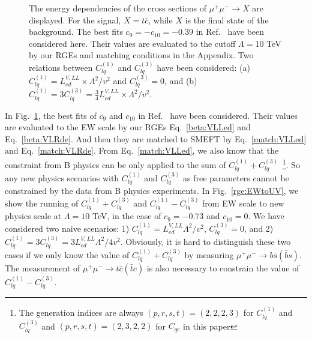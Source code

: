 \documentclass[a4paper,11pt]{article}
\begin{document}
\begin{figure}
  \centering
  \caption{The energy dependencies of the cross sections of $\mu^+\mu^-\to X$ are displayed. For the signal, $X=t\bar{c}$, while $X$ is the final state of the background. The best fits $c_{9}=-c_{10}=-0.39$ in Ref.~\cite{Altmannshofer:2021qrr} have been considered here. Their values are evaluated to the cutoff $\Lambda=10$ TeV by our RGEs and matching conditions in the Appendix. Two relations between $C^{(1)}_{lq}$ and $C^{(3)}_{lq}$ have been considered: (a) $C^{(1)}_{lq}=L^{V,LL}_{ed}\times \Lambda^2/v^2$ and $C^{(3)}_{lq}=0$, and (b) $C^{(1)}_{lq}=3C^{(3)}_{lq}=\frac{3}{4}L^{V,LL}_{ed}\times \Lambda^2/v^2$.\label{ecm}}
\end{figure}

In Fig.~\ref{ecm}, the best fits of $c_{9}$ and $c_{10}$ in Ref.~\cite{Altmannshofer:2021qrr} have been considered. 
Their values are evaluated to the EW scale by our RGEs Eq.~\ref{beta:VLLed} and Eq.~\ref{beta:VLRde}. 
And then they are matched to SMEFT by Eq.~\ref{match:VLLed} and Eq.~\ref{match:VLRde}. 
From Eq.~\ref{match:VLLed}, we also know that the constraint from B physics can be only applied to the sum of $C^{(1)}_{lq}+C^{(3)}_{lq}$~\footnote{The generation indices are always $(p,r,s,t)=(2,2,2,3)$ for $C^{(1)}_{lq}$ and $C^{(3)}_{lq}$ and $(p,r,s,t)=(2,3,2,2)$ for $C_{qe}$ in this paper}.  
So any new physics scenarios with $C^{(1)}_{lq}$ and $C^{(3)}_{lq}$ as free parameters cannot be constrained by the data from B physics experiments. 
In Fig.~\ref{rge:EWtoUV}, we show the running of $C^{(1)}_{lq}+C^{(3)}_{lq}$ and $C^{(1)}_{lq}-C^{(3)}_{lq}$ from EW scale to new physics scale at $\Lambda=10$ TeV, 
in the case of $c_{9}=-0.73$ and $c_{10}=0$.
We have considered two naive scenarios: 1) $C^{(1)}_{lq}=L^{V,LL}_{ed}\Lambda^2/v^2$, $C^{(3)}_{lq}=0$, and 2) $C^{(1)}_{lq}=3C^{(3)}_{lq}=3L^{V,LL}_{ed}\Lambda^2/4v^2$.
Obviously, it is hard to distinguish these two cases if we only know the value of $C^{(1)}_{lq}+C^{(3)}_{lq}$ by measuring $\mu^+\mu^-\to b\bar{s}(\bar{b}s)$. 
The measurement of $\mu^+\mu^-\to t\bar{c}(\bar{t}c)$ is also necessary to constrain the value of $C^{(1)}_{lq}-C^{(3)}_{lq}$. 
\end{document}
